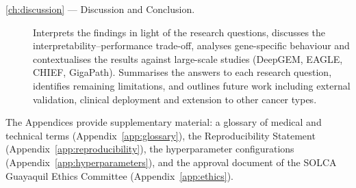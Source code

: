 \begin{description}
    \item[\cref{ch:discussion} --- Discussion and Conclusion.]
    Interprets the findings in light of the research questions,
    discusses the interpretability--performance trade-off, analyses
    gene-specific behaviour and contextualises the results against
    large-scale studies (DeepGEM, EAGLE, CHIEF, GigaPath).
    Summarises the answers to each research question, identifies
    remaining limitations, and outlines future work including external
    validation, clinical deployment and extension to other cancer types.
\end{description}

The Appendices provide supplementary material: a glossary of medical and technical terms (Appendix~\ref{app:glossary}), the Reproducibility Statement (Appendix~\ref{app:reproducibility}), the hyperparameter configurations (Appendix~\ref{app:hyperparameters}), and the approval document of the SOLCA Guayaquil Ethics Committee (Appendix~\ref{app:ethics}).
